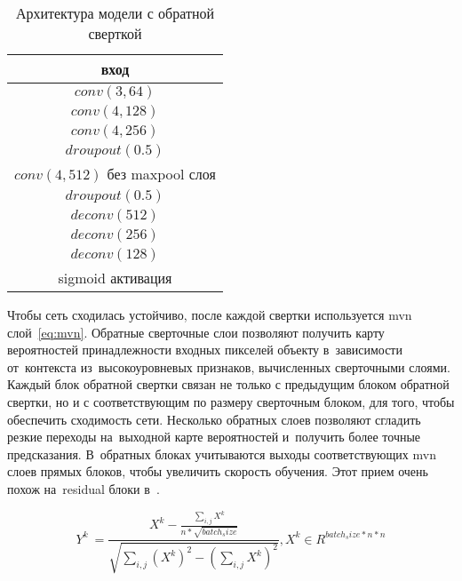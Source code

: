\begin{table}
  \begin{center}
    \caption{Архитектура модели с обратной сверткой} \label{tab:fcn}
    \begin{tabular}{ c }
      \hline
      вход                              \\ \hline
      $conv(3,64)$                      \\ \hline
      $conv(4,128)$                     \\ \hline
      $conv(4,256)$                     \\ \hline
      $droupout(0.5)$                   \\ \hline
      $conv(4,512)$ без maxpool слоя    \\ \hline
      $droupout(0.5)$                   \\ \hline
      $deconv(512)$                     \\ \hline
      $deconv(256)$                     \\ \hline  
      $deconv(128)$                     \\ \hline      
      sigmoid активация                 \\
      \hline
    \end{tabular}
  \end{center}
\end{table}

Чтобы сеть сходилась устойчиво, после каждой свертки используется mvn слой~\ref{eq:mvn}. Обратные сверточные слои позволяют получить карту вероятностей принадлежности входных пикселей объекту в~зависимости от~контекста из~высокоуровневых признаков, вычисленных сверточными слоями. Каждый блок обратной свертки связан не только с предыдущим блоком обратной свертки, но и с соответствующим по размеру сверточным блоком, для того, чтобы обеспечить сходимость сети. Несколько обратных слоев позволяют сгладить резкие переходы на~выходной карте вероятностей и~получить более точные предсказания. В~обратных блоках учитываются выходы соответствующих mvn слоев прямых блоков, чтобы увеличить скорость обучения. Этот прием очень похож на~residual блоки в~\cite{resnet}.

\begin{equation}
\label{eq:mvn}
Y^{k}\ = \frac{
    X^{k} 
    - \frac{
      \sum_{i,j}X^{k}
    }{
      n*\sqrt{batch_size}
    }
  }{\sqrt{
    \sum_{i,j}(X^{k})^2
    - (\sum_{i,j}X^{k})^2
}}, X^{k}\in{}R^{batch_size*n*n}
\end{equation}

